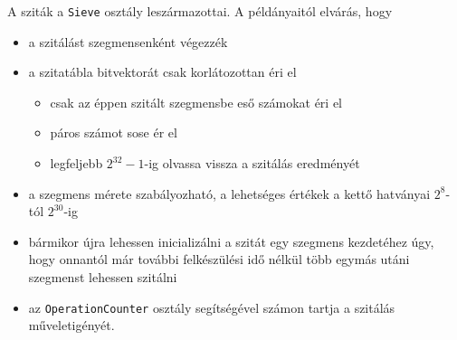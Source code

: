 A sziták a \texttt{Sieve} osztály leszármazottai.
A példányaitól elvárás, hogy
\begin{itemize}
\item a szitálást szegmensenként végezzék
\item a szitatábla bitvektorát csak korlátozottan éri el
\begin{itemize}
\item csak az éppen szitált szegmensbe eső számokat éri el
\item páros számot sose ér el
\item legfeljebb $2^{32}-1$-ig olvassa vissza a szitálás eredményét
\end{itemize}
\item a szegmens mérete szabályozható, a lehetséges értékek a kettő hatványai $2^8$-tól $2^{30}$-ig 
\item bármikor újra lehessen inicializálni a szitát egy szegmens kezdetéhez úgy, hogy onnantól már további felkészülési idő nélkül több egymás utáni szegmenst lehessen szitálni
\item az \texttt{OperationCounter} osztály segítségével számon tartja a szitálás műveletigényét.
\end{itemize}

